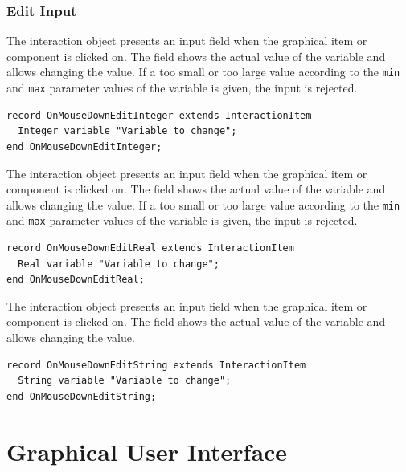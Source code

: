 \subsubsection{Edit Input}\label{edit-input}

The  interaction object presents an input field when the graphical item or component is clicked on.
The field shows the actual value of the variable and allows changing the value.
If a too small or too large value according to the \lstinline!min! and \lstinline!max! parameter values of the variable is given, the input is rejected.
\begin{lstlisting}[language=modelica]
record OnMouseDownEditInteger extends InteractionItem
  Integer variable "Variable to change";
end OnMouseDownEditInteger;
\end{lstlisting}

The  interaction object presents an input field when the graphical item or component is clicked on.
The field shows the actual value of the variable and allows changing the value.
If a too small or too large value according to the \lstinline!min! and \lstinline!max! parameter values of the variable is given, the input is rejected.
\begin{lstlisting}[language=modelica]
record OnMouseDownEditReal extends InteractionItem
  Real variable "Variable to change";
end OnMouseDownEditReal;
\end{lstlisting}

The  interaction object presents an input field when the graphical item or component is clicked on.
The field shows the actual value of the variable and allows changing the value.
\begin{lstlisting}[language=modelica]
record OnMouseDownEditString extends InteractionItem
  String variable "Variable to change";
end OnMouseDownEditString;
\end{lstlisting}


\section{Graphical User Interface}\label{annotations-for-the-graphical-user-interface}\label{graphical-user-interface}

